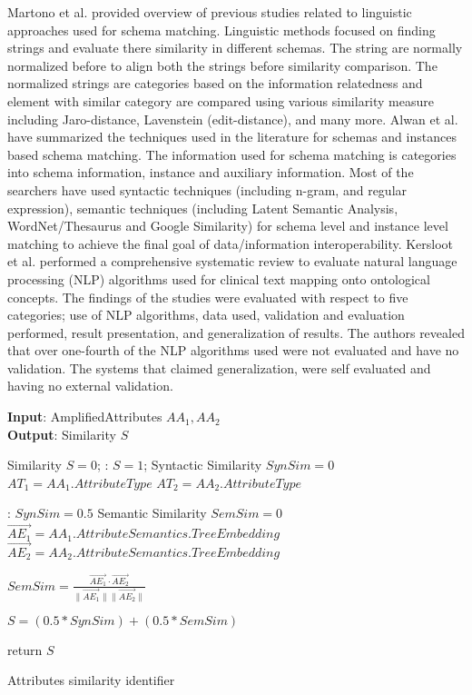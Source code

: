 Martono et al. \cite{martono2017review} provided overview of previous studies related to linguistic approaches used for schema matching. Linguistic methods focused on finding strings and evaluate there similarity in different schemas. The string are normally normalized before to align both the strings before similarity comparison. The normalized strings are categories based on the information relatedness and element with similar category are compared using various similarity measure including  Jaro-distance, Lavenstein (edit-distance), and many more. Alwan et al. \cite{alwan2017survey} have summarized the techniques used in the literature for schemas and instances based schema matching. The information used for schema matching is categories into  schema information, instance and auxiliary information. Most of the searchers have used syntactic techniques (including n-gram, and regular expression), semantic techniques (including Latent Semantic Analysis, WordNet/Thesaurus and Google Similarity) for schema level and instance level matching to achieve the final goal of data/information interoperability.  Kersloot et al. \cite{kersloot2020natural} performed a comprehensive systematic review to evaluate natural language processing (NLP) algorithms used for clinical text mapping onto ontological concepts. The findings of the studies were evaluated with respect to five categories; use of NLP algorithms, data used, validation and evaluation performed, result presentation, and generalization of results. The authors revealed that over one-fourth of the NLP algorithms used were not evaluated and have no validation. The systems that claimed generalization, were self evaluated and having no external validation.  

\begin{algorithm}
	\textbf{Input}: AmplifiedAttributes $ AA_1, AA_2$ \\
	\textbf{Output}: Similarity $S$ 
	\begin{algorithmic}[1]
		\State Similarity $S = 0$;
		:
			\State $S = 1$;
		\Else
			\State Syntactic Similarity $SynSim = 0 $
			\State $AT_1 = AA_1.AttributeType$
			\State $AT_2 = AA_2.AttributeType$
			
			: 
				\State	$SynSim = 0.5$
			\EndIf
			\State Semantic Similarity $SemSim = 0 $
			\State $\vec{AE_1} =  AA_1.Attribute Semantics
			.TreeEmbedding$
			\State $\vec{AE_2} =  AA_2.Attribute Semantics
			.TreeEmbedding$
			
			\State $SemSim = \frac{\vec{AE_1} \cdot \vec{AE_2}}{\|\vec{AE_1}\|\|\vec{AE_2}\|}$
			
			\State $S = (0.5 * SynSim) + (0.5 * SemSim) $
		\EndIf
		
		\State return $S$
		\caption{Attributes similarity identifier}
		\label{knowledgeEvolAlgo}
	\end{algorithmic}
\end{algorithm}
